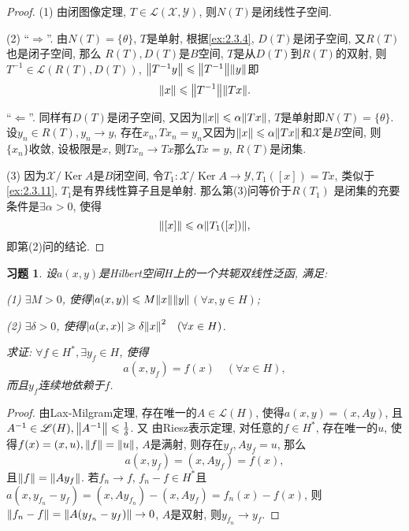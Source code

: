 \documentclass[a4paper,oneside,12pt]{ctexart}
\theoremstyle{plain}
\newtheorem{exercise}{习题}
\theoremstyle{nonumberplain}
\theoremstyle{nonumberplain}
\newtheorem{proof}{证明}
\newcommand{\sX}{\mathscr{X}}
\newcommand{\sY}{\mathscr{Y}}
\newcommand{\sL}{\mathscr{L}}
\DeclareMathOperator{\Ker}{Ker}
\begin{document}
    \begin{proof}
        (1) 由闭图像定理, $T\in\sL(\sX,\sY)$, 则$N(T)$是闭线性子空间.

        (2) ``$\Rightarrow$''. 由$N(T)=\{\theta\}$, $T$是单射, 根据\cref{ex:2.3.4}, $D(T)$是闭子空间, 又$R(T)$也是闭子空间, 那么 
        $R(T),D(T)$是$B$空间, $T$是从$D(T)$到$R(T)$的双射, 则$T^{-1}\in\sL(R(T),D(T))$, $\norm{T^{-1}y}\leqslant \norm{T^{-1}}\norm{y}$即 
        \begin{equation*}
            \norm{x}\leqslant \norm{T^{-1}}\norm{Tx}.
        \end{equation*}

        ``$\Leftarrow$''. 同样有$D(T)$是闭子空间, 又因为$\norm{x}\leqslant \alpha\norm{Tx}$, $T$是单射即$N(T)=\{\theta\}$. 设$y_n\in R(T),y_n\to y$, 
        存在$x_n,Tx_n=y_n$又因为$\norm{x}\leqslant \alpha\norm{Tx}$和$\sX$是$B$空间, 则$\{x_n\}$收敛, 设极限是$x$, 则$Tx_n\to Tx$那么$Tx=y$, 
        $R(T)$是闭集.

        (3) 因为$\sX/\Ker A$是$B$闭空间, 令$T_1:\sX/\Ker A\to\sY,T_1([x])=Tx$, 类似于\cref{ex:2.3.11}, $T_1$是有界线性算子且是单射. 那么第(3)问等价于$R(T_1)$
        是闭集的充要条件是$\exists \alpha>0$, 使得
        \begin{equation*}
            \norm{[x]}\leqslant\alpha\norm{T_1([x])},
        \end{equation*}
        即第(2)问的结论.
    \end{proof}

    \begin{exercise}
        \label{ex:2.3.13}
        设$a(x,y)$是Hilbert空间$H$上的一个共轭双线性泛函, 满足: 
        
        (1) $\exists M>0$, 使得$\abs{a(x,y)}\leqslant M\norm{x}\norm{y}$\quad$(\forall x,y\in H)$;

        (2) $\exists\delta>0$, 使得$\abs{a(x,x)}\geqslant \delta\norm{x}^2\quad(\forall x\in H)$.

        求证: $\forall f\in H^\ast,\exists y_f\in H$, 使得 
        \begin{equation*}
            a(x,y_f)=f(x)\quad (\forall x\in H),
        \end{equation*}
        而且$y_f$连续地依赖于$f$.
    \end{exercise}

    \begin{proof}
        由Lax-Milgram定理, 存在唯一的$A\in\sL(H)$, 使得$a(x,y)=(x,Ay)$, 且$A^{-1}\in\sL(H),\norm{A^{-1}}\leqslant\frac{1}{\delta}$. 又
        由Riesz表示定理, 对任意的$f\in H^\ast$, 存在唯一的$u$, 使得$f(x)=(x,u),\norm{f}=\norm{u}$, $A$是满射, 则存在$y_f,Ay_f=u$, 那么 
        \begin{equation*}
            a(x,y_f)=(x,Ay_f)=f(x),
        \end{equation*}
        且$\norm{f}=\norm{Ay_f}$. 若$f_n\to f$, $f_n-f\in H^\ast$且$a(x,y_{f_n}-y_f)=(x,Ay_{f_n})-(x,Ay_f)=f_n(x)-f(x)$, 则$\norm{f_n-f}=
        \norm{A(y_{f_n}-y_f)}\to 0$, $A$是双射, 则$y_{f_n}\to y_f$.
    \end{proof}
\end{document}
